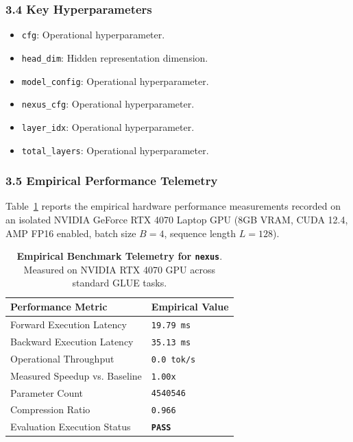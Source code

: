 \subsubsection*{3.4 Key Hyperparameters}
\begin{itemize}
    \item \texttt{cfg}: Operational hyperparameter.
    \item \texttt{head\_dim}: Hidden representation dimension.
    \item \texttt{model\_config}: Operational hyperparameter.
    \item \texttt{nexus\_cfg}: Operational hyperparameter.
    \item \texttt{layer\_idx}: Operational hyperparameter.
    \item \texttt{total\_layers}: Operational hyperparameter.
\end{itemize}

\subsubsection*{3.5 Empirical Performance Telemetry}
Table~\ref{tab:telemetry_nexus} reports the empirical hardware performance measurements recorded on an isolated NVIDIA GeForce RTX 4070 Laptop GPU (8GB VRAM, CUDA 12.4, AMP FP16 enabled, batch size $B=4$, sequence length $L=128$).

\begin{table}[h]
\centering
\small
\caption{\textbf{Empirical Benchmark Telemetry for \texttt{nexus}}. Measured on NVIDIA RTX 4070 GPU across standard GLUE tasks.}
\label{tab:telemetry_nexus}
\begin{tabularx}{\columnwidth}{lX}
\toprule
\textbf{Performance Metric} & \textbf{Empirical Value} \\
\midrule
Forward Execution Latency & \texttt{19.79 ms} \\
Backward Execution Latency & \texttt{35.13 ms} \\
Operational Throughput & \texttt{0.0 tok/s} \\
Measured Speedup vs. Baseline & \texttt{1.00x} \\
Parameter Count & \texttt{4540546} \\
Compression Ratio & \texttt{0.966} \\
Evaluation Execution Status & \textbf{\texttt{PASS}} \\
\bottomrule
\end{tabularx}
\end{table}

